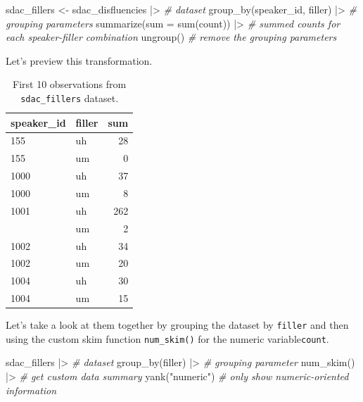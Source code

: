 \documentclass[
  letterpaper,
]{latex/krantz}
\newenvironment{Shaded}{\begin{snugshade}}{\end{snugshade}}
\newcommand{\AttributeTok}[1]{\textcolor[rgb]{0.00,0.00,0.00}{#1}}
\newcommand{\CommentTok}[1]{\textcolor[rgb]{0.00,0.00,0.00}{\textit{#1}}}
\newcommand{\FunctionTok}[1]{\textcolor[rgb]{0.00,0.00,0.00}{#1}}
\newcommand{\NormalTok}[1]{\textcolor[rgb]{0.00,0.00,0.00}{#1}}
\newcommand{\OtherTok}[1]{\textcolor[rgb]{0.00,0.00,0.00}{#1}}
\newcommand{\SpecialCharTok}[1]{\textcolor[rgb]{0.00,0.00,0.00}{#1}}
\newcommand{\StringTok}[1]{\textcolor[rgb]{0.00,0.00,0.00}{#1}}
\begin{document}
\begin{Shaded}
\begin{Highlighting}[]
\NormalTok{sdac\_fillers }\OtherTok{\textless{}{-}} 
\NormalTok{  sdac\_disfluencies }\SpecialCharTok{|\textgreater{}} \CommentTok{\# dataset}
  \FunctionTok{group\_by}\NormalTok{(speaker\_id, filler) }\SpecialCharTok{|\textgreater{}} \CommentTok{\# grouping parameters}
  \FunctionTok{summarize}\NormalTok{(}\AttributeTok{sum =} \FunctionTok{sum}\NormalTok{(count)) }\SpecialCharTok{|\textgreater{}} \CommentTok{\# summed counts for each speaker{-}filler combination}
  \FunctionTok{ungroup}\NormalTok{() }\CommentTok{\# remove the grouping parameters}
\end{Highlighting}
\end{Shaded}

Let's preview this transformation.

\hypertarget{tbl-i-bi-cont-sdac-fillers-preview}{}
\begin{table}
\caption{\label{tbl-i-bi-cont-sdac-fillers-preview}First 10 observations from \texttt{sdac\_fillers} dataset. }\tabularnewline

\centering
\begin{tabular}{llr}
\toprule
speaker\_id & filler & sum\\
\midrule
155 & uh & 28\\
155 & um & 0\\
1000 & uh & 37\\
1000 & um & 8\\
1001 & uh & 262\\
\addlinespace
1001 & um & 2\\
1002 & uh & 34\\
1002 & um & 20\\
1004 & uh & 30\\
1004 & um & 15\\
\bottomrule
\end{tabular}
\end{table}

Let's take a look at them together by grouping the dataset by
\texttt{filler} and then using the custom skim function
\texttt{num\_skim()} for the numeric variable\texttt{count}.

\begin{Shaded}
\begin{Highlighting}[]
\NormalTok{sdac\_fillers }\SpecialCharTok{|\textgreater{}} \CommentTok{\# dataset}
  \FunctionTok{group\_by}\NormalTok{(filler) }\SpecialCharTok{|\textgreater{}} \CommentTok{\# grouping parameter}
  \FunctionTok{num\_skim}\NormalTok{() }\SpecialCharTok{|\textgreater{}} \CommentTok{\# get custom data summary}
  \FunctionTok{yank}\NormalTok{(}\StringTok{"numeric"}\NormalTok{) }\CommentTok{\# only show numeric{-}oriented information}
\end{Highlighting}
\end{Shaded}
\end{document}
